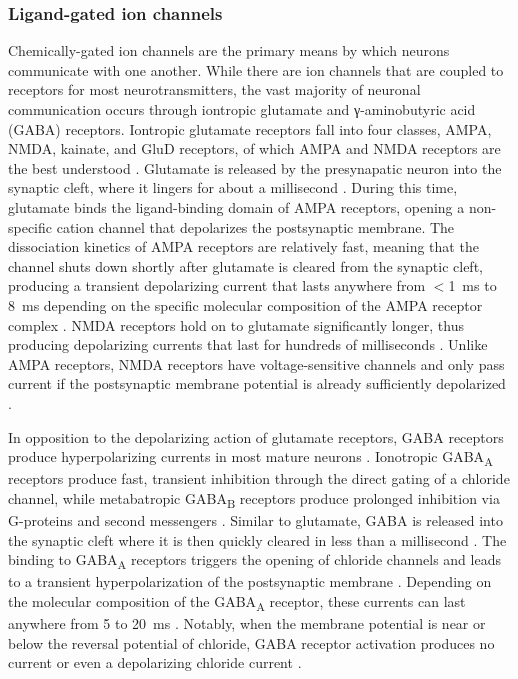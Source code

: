 \subsubsection{Ligand-gated ion channels} \label{sec:I_syn}
Chemically-gated ion channels are the primary means by which neurons communicate with one another. While there are ion channels that are coupled to receptors for most neurotransmitters, the vast majority of neuronal communication occurs through iontropic glutamate and γ-aminobutyric acid (GABA) receptors. Iontropic glutamate receptors fall into four classes, AMPA, NMDA, kainate, and GluD receptors, of which AMPA and NMDA receptors are the best understood \cite{Hansen2021}. Glutamate is released by the presynapatic neuron into the synaptic cleft, where it lingers for about a millisecond \cite{Clements1992}. During this time, glutamate binds the ligand-binding domain of AMPA receptors, opening a non-specific cation channel that depolarizes the postsynaptic membrane. The dissociation kinetics of AMPA receptors are relatively fast, meaning that the channel shuts down shortly after glutamate is cleared from the synaptic cleft, producing a transient depolarizing current that lasts anywhere from $<$\qty{1}{\milli\second} to \qty{8}{\milli\second} depending on the specific molecular composition of the AMPA receptor complex \cite{Geiger1997,Howe2015,Greger2017}. NMDA receptors hold on to glutamate significantly longer, thus producing depolarizing currents that last for hundreds of milliseconds \cite{Lester1990}. Unlike AMPA receptors, NMDA receptors have voltage-sensitive channels and only pass current if the postsynaptic membrane potential is already sufficiently depolarized \cite{Mayer1984}. 

In opposition to the depolarizing action of glutamate receptors, GABA receptors produce hyperpolarizing currents in most mature neurons \cite{Farrant2005}. Ionotropic GABA\textsubscript{A} receptors produce fast, transient inhibition through the direct gating of a chloride channel, while metabatropic GABA\textsubscript{B} receptors produce prolonged inhibition via G-proteins and second messengers \cite{Bettler2004}. Similar to glutamate, GABA is released into the synaptic cleft where it is then quickly cleared in less than a millisecond \cite{Mozrzymas2003}. The binding to GABA\textsubscript{A} receptors triggers the opening of chloride channels and leads to a transient hyperpolarization of the postsynaptic membrane \cite{Farrant2005}. Depending on the molecular composition of the GABA\textsubscript{A} receptor, these currents can last anywhere from 5 to \qty{20}{\milli\second} \cite{Farrant2005,Bacci2003}. Notably, when the membrane potential is near or below the reversal potential of chloride, GABA receptor activation produces no current or even a depolarizing chloride current \cite{Alger1979,Andersen1980}.

